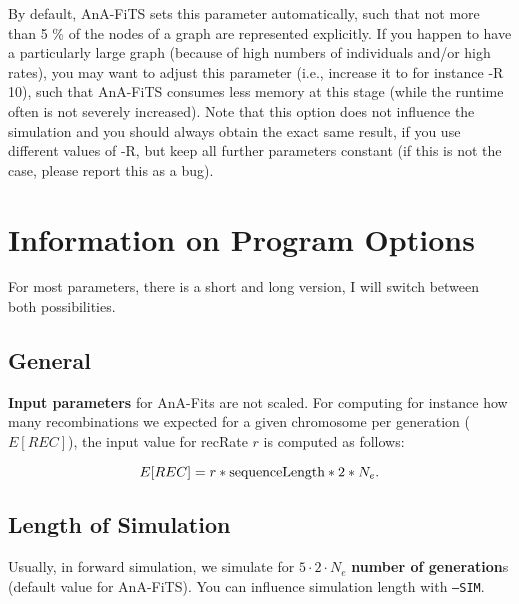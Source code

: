 \documentclass{scrartcl}
\begin{document}
By default, AnA-FiTS sets this parameter automatically, such that not
more than 5 \% of the nodes of a graph are represented explicitly. If
you happen to have a particularly large graph (because of high numbers
of individuals and/or high rates), you may want to adjust this
parameter (i.e., increase it to for instance -R 10), such that
AnA-FiTS consumes less memory at this stage (while the runtime often
is not severely increased). Note that this option does not influence
the simulation and you should always obtain the exact same result, if
you use different values of -R, but keep all further parameters
constant (if this is not the case, please report this as a bug). 



\section{Information on Program Options}
\label{sec:walk-through-options}

For most parameters, there is a short and long version, I will switch
between both possibilities. 

\subsection{General}
\label{sec:general}
\textbf{Input parameters} for AnA-Fits are not scaled.  For computing for
instance how many recombinations we expected for a given chromosome
per generation ($E[REC]$), the input value for recRate $r$ is
computed as follows: 

\begin{equation*}
  \label{eq:1}
  E[REC] = r * \textnormal{sequenceLength} * 2 * N_e. 
\end{equation*}


\subsection{Length of Simulation}
\label{sec:simulation-length}
Usually, in forward simulation, we simulate for $5 \cdot 2 \cdot N_e$
\textbf{number of generation}s (default value for AnA-FiTS). You can
influence simulation length with \texttt{--SIM}.
\end{document}
